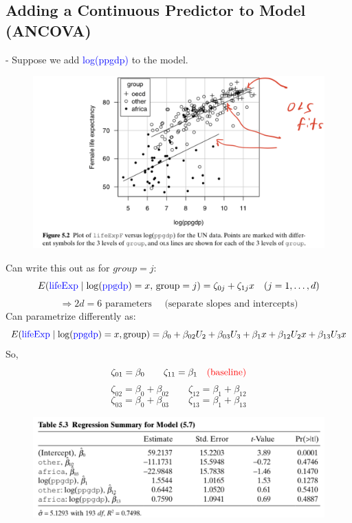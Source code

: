 \documentclass[14pt]{extarticle}
\begin{document}
\subsection*{Adding a Continuous Predictor to Model (ANCOVA)}

- Suppose we add \textcolor{blue}{log(ppgdp)} to the model.
\begin{figure}[H]
    \centering
    \includegraphics[width=1\textwidth]{fig22.png}
\end{figure}
\noindent
Can write this out as for $group = j$:
\[
E(\textcolor{blue}{\text{lifeExp}} \mid \log(\textcolor{blue}{\text{ppgdp}}) = x, \, \text{group} = j) = \zeta_{0j} + \zeta_{1j} x
\quad (j = 1, \dots, d)
\]
\[
\Rightarrow 2d = 6 \text{ parameters } \quad \text{(separate slopes and intercepts)}
\]
Can parametrize differently as:
\[
E(\textcolor{blue}{\text{lifeExp}} \mid \log(\textcolor{blue}{\text{ppgdp}}) = x, \text{group}) = \beta_0 + \beta_{02} U_2 + \beta_{03} U_3 + \beta_1 x + \beta_{12} U_2 x + \beta_{13} U_3 x
\]
So,
\[
\zeta_{01} = \beta_0 \quad \quad \zeta_{11} = \beta_1 \quad \textcolor{red}{\text{(baseline)}}
\]
\[
\zeta_{02} = \beta_0 + \beta_{02} \quad \quad \zeta_{12} = \beta_1 + \beta_{12}
\]
\[
\zeta_{03} = \beta_0 + \beta_{03} \quad \quad \zeta_{13} = \beta_1 + \beta_{13}
\]
\begin{figure}[H]
    \centering
    \includegraphics[width=1\textwidth]{fig23.png}
\end{figure}
\end{document}

